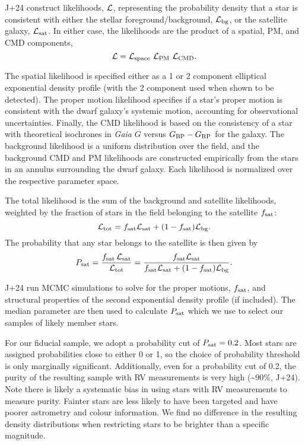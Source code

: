 J+24 construct likelihoods, \({\cal L}\), representing the probability
density that a star is consistent with either the stellar
foreground/background, \({\cal L}_{\rm bg}\), or the satellite galaxy,
\({\cal L}_{\rm sat}\). In either case, the likelihoods are the product
of a spatial, PM, and CMD components, \begin{equation}{
{\cal L} = {\cal L}_{\rm space}\ {\cal L}_{\rm PM}\ {\cal L}_{\rm CMD}.
}\end{equation}

The spatial likelihood is specified either as a 1 or 2 component
elliptical exponential density profile (with the 2 component used when
shown to be detected). The proper motion likelihood specifies if a
star's proper motion is consistent with the dwarf galaxy's systemic
motion, accounting for observational uncertainties. Finally, the CMD
likelihood is based on the consistency of a star with theoretical
isochrones in \emph{Gaia} \(G\) versus \(G_{\rm BP}- G_{\rm RP}\) for
the galaxy. The background likelihood is a uniform distribution over the
field, and the background CMD and PM likelihoods are constructed
empirically from the stars in an annulus surrounding the dwarf galaxy.
Each likelihood is normalized over the respective parameter space.

The total likelihood is the sum of the background and satellite
likelihoods, weighted by the fraction of stars in the field belonging to
the satellite \(f_{\rm sat}\): \begin{equation}{
{\cal L}_{\rm tot} = f_{\rm sat}{\cal L}_{\rm sat} + (1-f_{\rm sat}){\cal L}_{\rm bg}.
}\end{equation} The probability that any star belongs to the satellite
is then given by \begin{equation}{
P_{\rm sat} = 
\frac{f_{\rm sat}\,{\cal L}_{\rm sat}}{{\cal L}_{\rm tot}}
= \frac{f_{\rm sat}{\cal L}_{\rm sat}}{f_{\rm sat}{\cal L}_{\rm sat} + (1-f_{\rm sat}){\cal L}_{\rm bg}}.
}\end{equation}

J+24 run MCMC simulations to solve for the proper motions,
\(f_{\rm sat}\), and structural properties of the second exponential
density profile (if included). The median parameter are then used to
calculate \(P_{\rm sat}\) which we use to select our samples of likely
member stars.

For our fiducial sample, we adopt a probability cut of
\(P_{\rm sat} = 0.2\). Most stars are assigned probabilities close to
either 0 or 1, so the choice of probability threshold is only marginally
significant. Additionally, even for a probability cut of 0.2, the purity
of the resulting sample with RV measurements is very high
(\textasciitilde90\%, J+24). Note there is likely a systematic bias in
using stars with RV measurements to measure purity. Fainter stars are
less likely to have been targeted and have poorer astrometry and colour
information. We find no difference in the resulting density
distributions when restricting stars to be brighter than a specific
magnitude.

